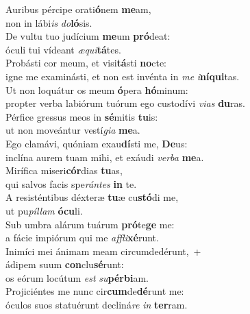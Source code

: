 \evenverse Auribus pércipe orati\textbf{ó}nem \textbf{me}am,~\*\\
\evenverse non in lábi\textit{is} \textit{do}\textbf{ló}sis.\\
\oddverse De vultu tuo judícium \textbf{me}um \textbf{pró}deat:~\*\\
\oddverse óculi tui vídeant \textit{æ}\textit{qui}\textbf{tá}tes.\\
\evenverse Probásti cor meum, et visi\textbf{tá}sti \textbf{no}cte:~\*\\
\evenverse igne me examinásti, et non est invénta in \textit{me} \textit{i}\textbf{ní}\textbf{qui}tas.\\
\oddverse Ut non loquátur os meum \textbf{ó}pera \textbf{hó}minum:~\*\\
\oddverse propter verba labiórum tuórum ego custodívi \textit{vi}\textit{as} \textbf{du}ras.\\
\evenverse Pérfice gressus meos in \textbf{sé}mitis \textbf{tu}is:~\*\\
\evenverse ut non moveántur vestí\textit{gi}\textit{a} \textbf{me}a.\\
\oddverse Ego clamávi, quóniam exau\textbf{dí}sti me, \textbf{De}us:~\*\\
\oddverse inclína aurem tuam mihi, et exáudi \textit{ver}\textit{ba} \textbf{me}a.\\
\evenverse Mirífica miseri\textbf{cór}dias \textbf{tu}as,~\*\\
\evenverse qui salvos facis spe\textit{rán}\textit{tes} \textbf{in} te.\\
\oddverse A resisténtibus déxteræ \textbf{tu}æ cu\textbf{stó}di me,~\*\\
\oddverse ut pu\textit{píl}\textit{lam} \textbf{ó}\textbf{cu}li.\\
\evenverse Sub umbra alárum tuárum \textbf{pró}te\textbf{ge} me:~\*\\
\evenverse a fácie impiórum qui me \textit{af}\textit{fli}\textbf{xé}runt.\\
\oddverse Inimíci mei ánimam meam circumdedérunt,~+\\
\oddverse  ádipem suum \textbf{con}clu\textbf{sé}runt:~\*\\
\oddverse os eórum locútum \textit{est} \textit{su}\textbf{pér}\textbf{bi}am.\\
\evenverse Projiciéntes me nunc cir\textbf{cum}de\textbf{dé}runt me:~\*\\
\evenverse óculos suos statuérunt decliná\textit{re} \textit{in} \textbf{ter}ram.\\
